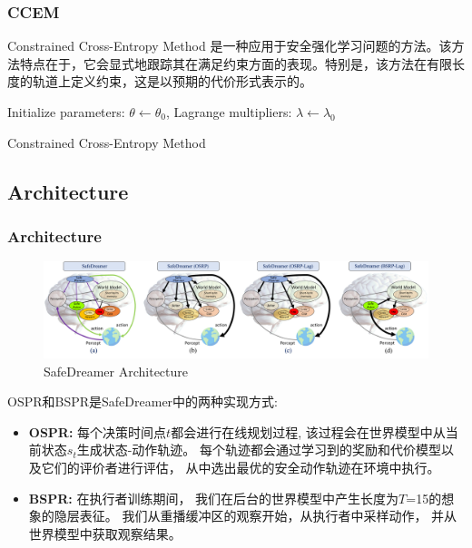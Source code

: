 \documentclass[10pt,mathserif]{beamer}%
\begin{document}
\begin{frame}[t, fragile]
	\frametitle{CCEM}
 Constrained Cross-Entropy Method 是一种应用于安全强化学习问题的方法。该方法特点在于，它会显式地跟踪其在满足约束方面的表现。特别是，该方法在有限长度的轨道上定义约束，这是以预期的代价形式表示的。
	\begin{algorithm}[H]
	\SetAlgoLined
	Initialize parameters: $\theta \leftarrow \theta_0$, Lagrange multipliers: $\lambda \leftarrow \lambda_0$\;
	\caption{Constrained Cross-Entropy Method}
	\end{algorithm}
	\end{frame}

\subsection{Architecture}
\begin{frame}[t, fragile]
	\frametitle{Architecture}
	\begin{figure}
		\centering
		\includegraphics[width=0.9\linewidth]{./images/brain.pdf}
		\caption{SafeDreamer Architecture}
		\label{Fig:net}
	\end{figure}
	\begin{spacing}{1.5}
		OSPR和BSPR是SafeDreamer中的两种实现方式:
		{
		\fontsize{10}\selectfont
		\begin{itemize}
			\item\textbf{OSPR:} 每个决策时间点$t$都会进行在线规划过程,
			该过程会在世界模型中从当前状态$s_{t}$生成状态-动作轨迹。
			每个轨迹都会通过学习到的奖励和代价模型以及它们的评价者进行评估，
			从中选出最优的安全动作轨迹在环境中执行。
			\item\textbf{BSPR:} 在执行者训练期间，
			我们在后台的世界模型中产生长度为$T$=15的想象的隐层表征。
			我们从重播缓冲区的观察开始，从执行者中采样动作，
			并从世界模型中获取观察结果。
		\end{itemize}
		}	
	\end{spacing}
\end{frame}
\end{document}
